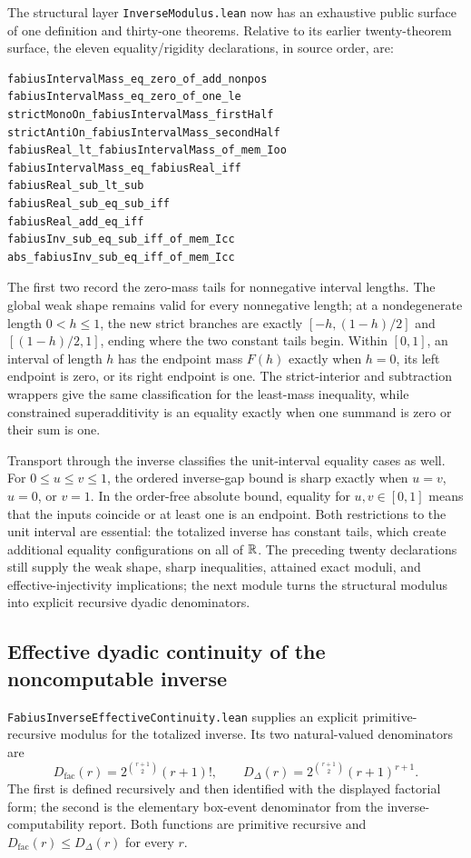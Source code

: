 \documentclass[11pt,oneside]{article}
\theoremstyle{definition}
\theoremstyle{remark}
\begin{document}
The structural layer \nolinkurl{InverseModulus.lean} now has an exhaustive public
surface of one definition and thirty-one theorems.  Relative to its earlier
twenty-theorem surface, the eleven equality/rigidity declarations, in source order, are:
\begin{lstlisting}[style=pseudo]
fabiusIntervalMass_eq_zero_of_add_nonpos
fabiusIntervalMass_eq_zero_of_one_le
strictMonoOn_fabiusIntervalMass_firstHalf
strictAntiOn_fabiusIntervalMass_secondHalf
fabiusReal_lt_fabiusIntervalMass_of_mem_Ioo
fabiusIntervalMass_eq_fabiusReal_iff
fabiusReal_sub_lt_sub
fabiusReal_sub_eq_sub_iff
fabiusReal_add_eq_iff
fabiusInv_sub_eq_sub_iff_of_mem_Icc
abs_fabiusInv_sub_eq_iff_of_mem_Icc
\end{lstlisting}
The first two record the zero-mass tails for nonnegative interval lengths.  The
global weak shape remains valid for every nonnegative length; at a nondegenerate
length \(0<h\leq1\), the new strict branches are exactly
\([-h,(1-h)/2]\) and \([(1-h)/2,1]\), ending where the two constant tails begin.
Within \([0,1]\), an interval of length \(h\) has the endpoint mass \(F(h)\)
exactly when \(h=0\), its left endpoint is zero, or its right endpoint is one.
The strict-interior and subtraction wrappers give the same classification for the
least-mass inequality, while constrained superadditivity is an equality exactly
when one summand is zero or their sum is one.

Transport through the inverse classifies the unit-interval equality cases as well.
For \(0\leq u\leq v\leq1\), the ordered inverse-gap bound is sharp exactly when
\(u=v\), \(u=0\), or \(v=1\).  In the order-free absolute bound, equality for
\(u,v\in[0,1]\) means that the inputs coincide or at least one is an endpoint.
Both restrictions to the unit interval are essential: the totalized inverse has
constant tails, which create additional equality configurations on all of \(\mathbb{R}\).
The preceding twenty declarations still supply the weak shape, sharp inequalities,
attained exact moduli, and effective-injectivity implications; the next module turns
the structural modulus into explicit recursive dyadic denominators.

\subsection{Effective dyadic continuity of the noncomputable inverse}

\nolinkurl{FabiusInverseEffectiveContinuity.lean} supplies an explicit
primitive-recursive modulus for the totalized inverse.  Its two
natural-valued denominators are
\[
 D_{\mathrm{fac}}(r)=2^{\binom{r+1}{2}}(r+1)!,
 \qquad
 D_{\Delta}(r)=2^{\binom{r+1}{2}}(r+1)^{r+1}.
\]
The first is defined recursively and then identified with the displayed
factorial form; the second is the elementary box-event denominator from the
inverse-computability report.  Both functions are primitive recursive and
\(D_{\mathrm{fac}}(r)\le D_{\Delta}(r)\) for every \(r\).
\end{document}
